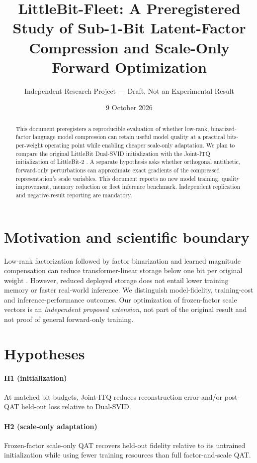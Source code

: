 \documentclass[11pt]{article}
\title{LittleBit-Fleet: A Preregistered Study of Sub-1-Bit Latent-Factor Compression and Scale-Only Forward Optimization}
\author{Independent Research Project --- Draft, Not an Experimental Result}
\date{9 October 2026}
\begin{document}
\maketitle
\begin{abstract}
This document preregisters a reproducible evaluation of whether low-rank, binarized-factor language model compression can retain useful model quality at a practical bits-per-weight operating point while enabling cheaper scale-only adaptation. We plan to compare the original LittleBit Dual-SVID initialization \cite{lee2025littlebit} with the Joint-ITQ initialization of LittleBit-2 \cite{lee2026littlebit2}. A separate hypothesis asks whether orthogonal antithetic, forward-only perturbations can approximate exact gradients of the compressed representation's scale variables. This document reports no new model training, quality improvement, memory reduction or fleet inference benchmark. Independent replication and negative-result reporting are mandatory.
\end{abstract}
\section{Motivation and scientific boundary}
Low-rank factorization followed by factor binarization and learned magnitude compensation can reduce transformer-linear storage below one bit per original weight \cite{lee2025littlebit}. However, reduced deployed storage does not entail lower training memory or faster real-world inference. We distinguish model-fidelity, training-cost and inference-performance outcomes. Our optimization of frozen-factor scale vectors is an \emph{independent proposed extension}, not part of the original result and not proof of general forward-only training.
\section{Hypotheses}
\paragraph{H1 (initialization)} At matched bit budgets, Joint-ITQ reduces reconstruction error and/or post-QAT held-out loss relative to Dual-SVID.
\paragraph{H2 (scale-only adaptation)} Frozen-factor scale-only QAT recovers held-out fidelity relative to its untrained initialization while using fewer training resources than full factor-and-scale QAT.
\end{document}
